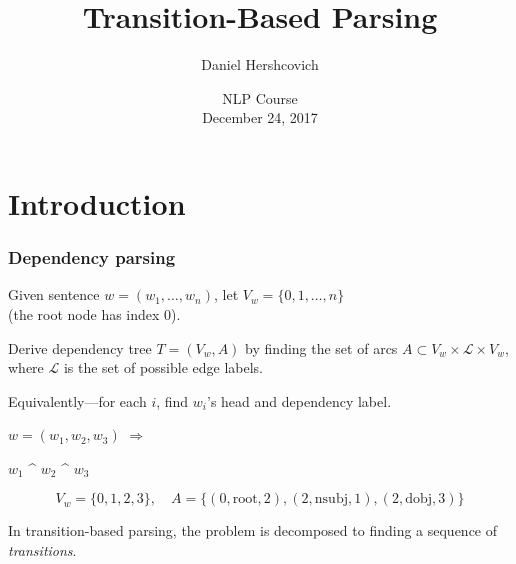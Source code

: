 \documentclass[t]{beamer}
\title{Transition-Based Parsing}
\author{Daniel Hershcovich}
\date{NLP Course \\ December 24, 2017}
\begin{document}
\begin{frame}
\titlepage
\end{frame}



\section{Introduction}

\begin{frame}
  \frametitle{Dependency parsing}
  Given sentence $w=(w_1, \ldots, w_n)$,
  let $V_w=\{0, 1, \ldots, n \}$ \\
  (the root node has index 0).
  
  Derive dependency tree $T=(V_w,A)$ by finding the set of arcs
  $A \subset V_w \times \mathcal{L} \times V_w$,
  where $\mathcal{L}$ is the set of possible edge labels.
  
  \vfill

  Equivalently---for each $i$, find $w_i$'s head and dependency label.
  
  \pause
  
  \begin{center}
	  \begin{minipage}{4cm}
	    $w=(w_1, w_2, w_3)$ \hfill $\Rightarrow$
	  \end{minipage}
	  \begin{minipage}{5cm}
	    \begin{dependency}
	      \begin{deptext}[column sep=1.5em,ampersand replacement=\^,font=\rmfamily]
	        $w_1$ \^ $w_2$ \^ $w_3$ \\
	      \end{deptext}
	    \end{dependency}
	  \end{minipage}
  \end{center}
  \[
      V_w=\{0,1,2,3\}, \quad
      A=\{(0,\mathrm{root},2),(2,\mathrm{nsubj},1),(2,\mathrm{dobj},3)\}
  \]
  
  \pause

  In transition-based parsing,
  the problem is decomposed to finding a sequence of \textit{transitions}.
\end{frame}
\end{document}
